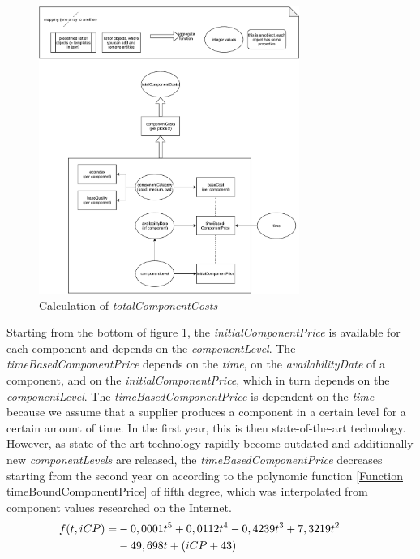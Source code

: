 \begin{figure} [!htbp]
	\centering
	\includegraphics[width=8.5cm]{images/totalComponentCosts.pdf}
	\caption{Calculation of \textit{totalComponentCosts}}
	\label{img:totalComponentCosts}
\end{figure}
Starting from the bottom of figure \ref{img:totalComponentCosts}, the \textit{initialComponentPrice} is available for each component and depends on the \textit{componentLevel}.
The \textit{timeBasedComponentPrice} depends on the \textit{time}, on the \textit{availabilityDate} of a component, and on the \textit{initialComponentPrice}, which in turn depends on the \textit{componentLevel}.
The \textit{timeBasedComponentPrice} is dependent on the \textit{time} because we assume that a supplier produces a component in a certain level for a certain amount of time. In the first year, this is then state-of-the-art technology. However, as state-of-the-art technology rapidly become outdated and additionally new \textit{componentLevels} are released, the \textit{timeBasedComponentPrice} decreases starting from the second year on according to the polynomic function \ref{Function timeBoundComponentPrice} of fifth degree, which was interpolated from component values researched on the Internet.
\begin{equation}
\label{Function timeBoundComponentPrice}
\begin{aligned}
   f(t, iCP) = & - 0,0001t\textsuperscript{5} + 0,0112t\textsuperscript{4} - 0,4239t\textsuperscript{3} + 7,3219t\textsuperscript{2} \\
   & - 49,698t + (iCP+43)&& 
\end{aligned}   
\end{equation}
